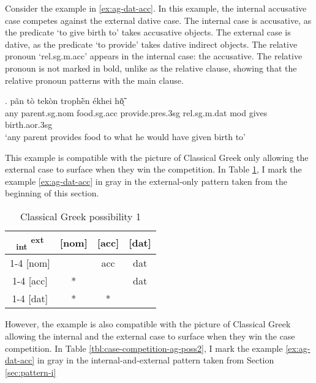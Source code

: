Consider the example in \ref{ex:ag-dat-acc}. In this example, the internal accusative case competes against the external dative case.
The internal case is accusative, as the predicate  `to give birth to' takes accusative objects.
The external case is dative, as the predicate  `to provide' takes dative indirect objects.
The relative pronoun  `\ac{rel}.\ac{sg}.\ac{m}.\ac{acc}' appears in the internal case: the accusative. The relative pronoun is not marked in bold, unlike as the relative clause, showing that the relative pronoun patterns with the main clause.

\exg. pãn {tò tekòn} trophḕn ékhei hō̃ͅ  \\
any parent.\ac{sg}.\ac{nom} food.\ac{sg}.\ac{acc} provide.\ac{pres}.3\ac{sg} \ac{rel}.\ac{sg}.\ac{m}.\ac{dat} \ac{mod} {gives birth}.\ac{aor}.3\ac{sg}\\
`any parent provides food to what he would have given birth to' \label{ex:ag-dat-acc}

This example is compatible with the picture of Classical Greek only allowing the external case to surface when they win the competition. In Table \ref{tbl:case-competition-ag-poss1}, I mark the example \ref{ex:ag-dat-acc} in gray in the external-only pattern taken from the beginning of this section.

\begin{table}[H]
  \center
  \caption{Classical Greek possibility 1}
  \begin{tabular}{c|c|c|c}
    \toprule
    \textsubscript{\ac{int}} \textsuperscript{\ac{ext}}
           & [\ac{nom}]
           & [\ac{acc}]
           & [\ac{dat}]
           \\ \cmidrule{1-4}
       [\ac{nom}]
           & \xcancel{\phantom{xx}}
           & \ac{acc}
           & \ac{dat}
           \\ \cmidrule{1-4}
       [\ac{acc}]
           & *
           & \xcancel{\phantom{xx}}
           & \cellcolor{LG}\ac{dat}
           \\ \cmidrule{1-4}
       [\ac{dat}]
           & *
           & *
           & \xcancel{\phantom{xx}}
           \\
     \bottomrule
  \end{tabular}
    \label{tbl:case-competition-ag-poss1}
\end{table}

However, the example is also compatible with the picture of Classical Greek allowing the internal and the external case to surface when they win the case competition. In Table \ref{tbl:case-competition-ag-poss2}, I mark the example \ref{ex:ag-dat-acc} in gray in the internal-and-external pattern taken from Section \ref{sec:pattern-i}

